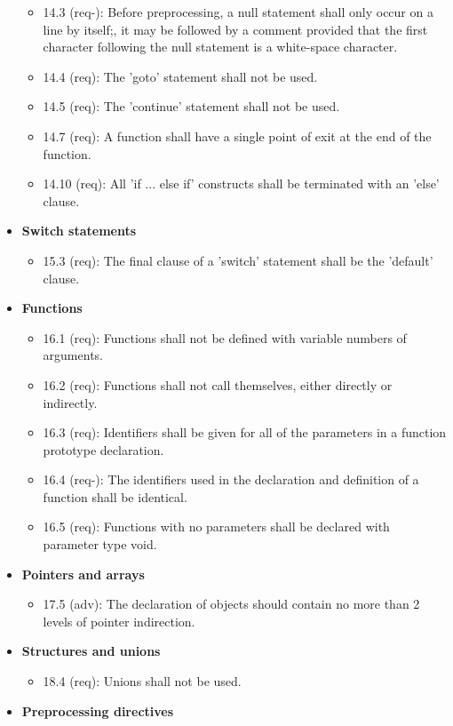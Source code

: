 \begin{itemize}
\begin{itemize}
\item 14.3 (req-): Before preprocessing, a null statement shall only occur on a line by itself;, it may be followed by a comment provided that the first character following the null statement is a white-space character.
\item 14.4 (req): The 'goto' statement shall not be used.
\item 14.5 (req): The 'continue' statement shall not be used.
\item 14.7 (req): A function shall have a single point of exit at the end of the function.
\item 14.10 (req): All 'if ... else if' constructs shall be terminated with an 'else' clause.
\end{itemize}
\item \textbf{Switch statements}
\begin{itemize}
\item 15.3 (req): The final clause of a 'switch' statement shall be the 'default' clause.
\end{itemize}
\item \textbf{Functions}
\begin{itemize}
\item 16.1 (req): Functions shall not be defined with variable numbers of arguments.
\item 16.2 (req): Functions shall not call themselves, either directly or indirectly.
\item 16.3 (req): Identifiers shall be given for all of the parameters in a function prototype declaration.
\item 16.4 (req-): The identifiers used in the declaration and definition of a function shall be identical.
\item 16.5 (req): Functions with no parameters shall be declared with parameter type void.
\end{itemize}
\item \textbf{Pointers and arrays}
\begin{itemize}
\item 17.5 (adv): The declaration of objects should contain no more than 2 levels of pointer indirection.
\end{itemize}
\item \textbf{Structures and unions}
\begin{itemize}
\item 18.4 (req): Unions shall not be used.
\end{itemize}
\item \textbf{Preprocessing directives}

\end{itemize}
